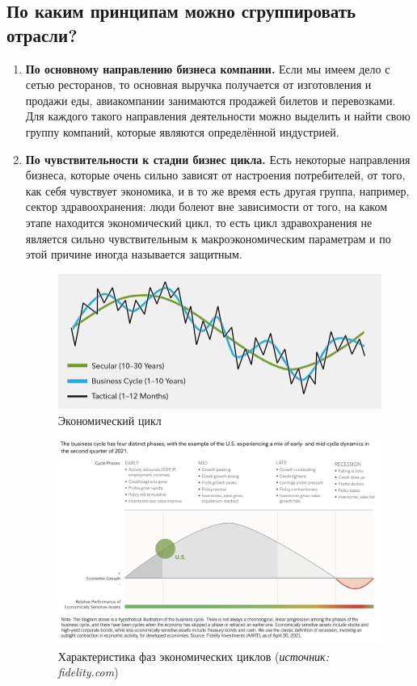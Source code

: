 \documentclass{article}
\begin{document}
	\subsection{По каким принципам можно сгруппировать отрасли?}
	\begin{enumerate}
		\item \textbf{По основному направлению бизнеса компании.} Если мы имеем дело с сетью ресторанов, то основная выручка получается от изготовления и продажи еды, авиакомпании занимаются продажей билетов и перевозками. Для каждого такого направления деятельности можно выделить и найти свою группу компаний, которые являются определённой индустрией.
		
		\item \textbf{По чувствительности к стадии бизнес цикла.} Есть некоторые направления бизнеса, которые очень сильно зависят от настроения потребителей, от того, как себя чувствует экономика, и в то же время есть другая группа, например, сектор здравоохранения: люди болеют вне зависимости от того, на каком этапе находится экономический цикл, то есть цикл здравохранения не является сильно чувствительным к макроэкономическим параметрам и по этой причине иногда называется защитным.
	\begin{figure}[h!]
			\centering
			\includegraphics[scale = 0.38]{cycle1.jpg}
			\caption{Экономический цикл}
			\label{model}
		\end{figure}
		\newpage
		
		\begin{figure}[h]
			\centering
			\includegraphics[scale = 0.64]{cycle2.png}
			\caption{Характеристика фаз экономических циклов (\textit{источник: fidelity.com})}
			\label{model}
		\end{figure}
		

\end{enumerate}
\end{document}
